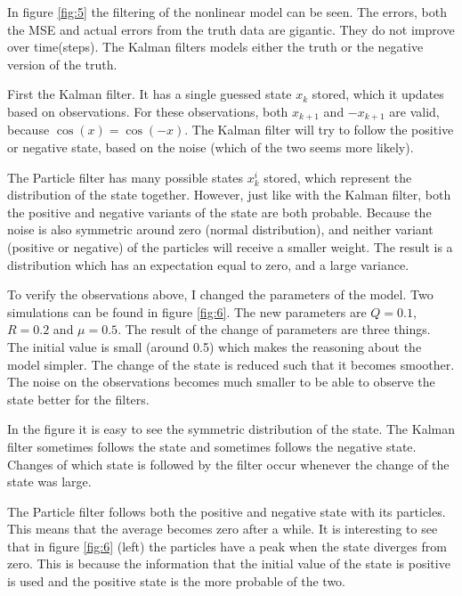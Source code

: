 \documentclass[paper=a4, fontsize=11pt]{scrartcl} %
\numberwithin{equation}{section} %
\numberwithin{figure}{section} %
\numberwithin{table}{section} %
\begin{document}
In figure \ref{fig:5} the filtering of the nonlinear model can be seen. The errors, both the MSE and actual errors from the truth data are gigantic. They do not improve over time(steps). The Kalman filters models either the truth or the negative version of the truth.

First the Kalman filter. It has a single guessed state $x_k$ stored, which it updates based on observations. For these observations, both $x_{k+1}$ and $-x_{k+1}$ are valid, because $\cos(x)=\cos(-x)$. The Kalman filter will try to follow the positive or negative state, based on the noise (which of the two seems more likely).

The Particle filter has many possible states $x_k^i$ stored, which represent the distribution of the state together. However, just like with the Kalman filter, both the positive and negative variants of the state are both probable. Because the noise is also symmetric around zero (normal distribution), and neither variant (positive or negative) of the particles will receive a smaller weight. The result is a distribution which has an expectation equal to zero, and a large variance.

To verify the observations above, I changed the parameters of the model. Two simulations can be found in figure \ref{fig:6}. The new parameters are $Q=0.1$, $R=0.2$ and $\mu=0.5$. The result of the change of parameters are three things. The initial value is small (around 0.5) which makes the reasoning about the model simpler. The change of the state is reduced such that it becomes smoother. The noise on the observations becomes much smaller to be able to observe the state better for the filters.

In the figure it is easy to see the symmetric distribution of the state. The Kalman filter sometimes follows the state and sometimes follows the negative state. Changes of which state is followed by the filter occur whenever the change of the state was large.

The Particle filter follows both the positive and negative state with its particles. This means that the average becomes zero after a while. It is interesting to see that in figure \ref{fig:6} (left) the particles have a peak when the state diverges from zero. This is because the information that the initial value of the state is positive is used and the positive state is the more probable of the two.
\end{document}
